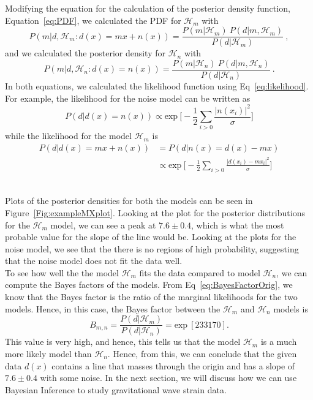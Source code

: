 \documentclass{article}
\begin{document}
Modifying the equation for the calculation of the posterior density function, Equation~\ref{eq:PDF}, we calculated the PDF for $\mathcal{H}_{m}$ with 
\begin{equation} \label{eq:PDFforMX}
	P(m|d,\mathcal{H}_{m}:d(x) = mx + n(x))  = \frac{P(m| \mathcal{H}_{m}) \ P(d|m,  \mathcal{H}_{m})}  { P(d|\mathcal{H}_{m})} \ ,
\end{equation}
 and we calculated the posterior density for $\mathcal{H}_{n}$ with \begin{equation} \label{eq:PDFforMXnoise}
 P(m|d,\mathcal{H}_{n}:d(x) = n(x))  = \frac{P(m| \mathcal{H}_{n}) \ P(d|m,  \mathcal{H}_{n})}  { P(d|\mathcal{H}_{n})} \ .
 \end{equation} In both equations, we calculated the likelihood function using Eq~\ref{eq:likelihood}. For example, the likelihood for the noise model can be written as $$ P(d|d(x)=n(x)) \propto \text{exp} \ \bigg[ -\frac{1}{2} \sum_{i>0} \frac{| n(x_i)|^2}{\sigma}	\bigg]$$ 
 while the likelihood for the model $\mathcal{H}_{m}$ is  
 \begin{align*}
  P(d|d(x)=mx+n(x)) & = P(d|n(x)=d(x)-mx)\\
  &\propto \text{exp} \ \bigg[ -\frac{1}{2} \sum_{i>0} \frac{|d(x_i) - mx_i|^2}{\sigma}	\bigg]
 \end{align*}

  \noindent $\text{ }$\\
 
  Plots of the posterior densities for both the models can be seen in Figure~\ref{Fig:exampleMXplot}. Looking at the plot for the posterior distributions for the $\mathcal{H}_{m}$ model, we can see a peak at $7.6\pm 0.4$, which is what the most probable value for the slope of the line would be. Looking at the plots for the noise model, we see that the there is no regions of high probability, suggesting that the noise model does not fit the data well. \\
 

To see how well the the model $\mathcal{H}_{m}$ fits the data compared to model $\mathcal{H}_{n}$, we can compute the Bayes factors of the models. From Eq~\ref{eq:BayesFactorOrig}, we know that the Bayes factor is the ratio of the marginal likelihoods for the two models. Hence, in this case, the Bayes factor between the $\mathcal{H}_{m}$ and $\mathcal{H}_{n}$ models is $$B_{m,n} = \frac{P(d|\mathcal{H}_{m})}{P(d|\mathcal{H}_{n})} = \text{exp}\ [233170].$$ This value is very high, and hence, this tells us that the model $\mathcal{H}_{m}$ is a much more likely model than $\mathcal{H}_{n}$. Hence, from this, we can conclude that the given data $d(x)$ contains a line that masses through the origin and has a slope of $7.6\pm 0.4$ with some noise. In the next section, we will discuss how we can use Bayesian Inference to study gravitational wave strain data.\\
\end{document}
